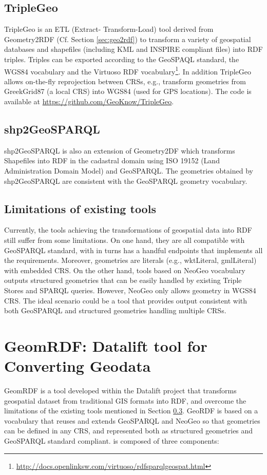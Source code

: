\subsection{TripleGeo}
TripleGeo \cite{triplegeo2014} is an ETL (Extract- Transform-Load) tool derived from Geometry2RDF (Cf. Section \ref{sec:geo2rdf}) to transform a variety of geospatial databases and shapefiles (including KML and INSPIRE compliant files) into RDF triples. Triples can be exported according to the GeoSPAQL standard, the WGS84 vocabulary and the Virtuoso RDF vocabulary\footnote{\url{http://docs.openlinksw.com/virtuoso/rdfsparqlgeospat.html}}. In addition TripleGeo allows on-the-fly reprojection between CRSs, e.g., transform geometries from GreekGrid87 (a local CRS) into WGS84 (used for GPS locations). The code is available at \url{https://github.com/GeoKnow/TripleGeo}.

\subsection{shp2GeoSPARQL}
shp2GeoSPARQL \cite{saavedra14} is also an extension of Geometry2DF which transforms Shapefiles into RDF in the cadastral domain using ISO 19152 \cite{iso2012} (Land Administration Domain Model) and GeoSPARQL. The geometries obtained by shp2GeoSPARQL are consistent with the GeoSPARQL geometry vocabulary.

\subsection{Limitations of existing tools}
\label{sec:limitations}

Currently, the tools achieving the transformations of geospatial data into RDF still suffer from some limitations. On one hand, they are all compatible with GeoSPARQL standard, with in turns has a handful endpoints that implements all the requirements. Moreover, geometries are literals (e.g., wktLiteral, gmlLiteral) with embedded CRS. On the other hand, tools based on NeoGeo vocabulary outputs structured geometries that can be easily handled by existing Triple Stores and SPARQL queries. However, NeoGeo only allows geometry in WGS84 CRS. The ideal scenario could be a tool that provides output consistent with both GeoSPARQL and structured geometries handling multiple CRSs. 


\section{GeomRDF: Datalift tool for Converting Geodata}
\label{sec:geomRDF}
GeomRDF \cite{hamdi14} is a tool developed within the Datalift project that transforms geospatial dataset from traditional GIS formats into RDF, and overcome the limitations of the existing tools mentioned in Section \ref{sec:limitations}. GeoRDF is based on a vocabulary that reuses and extends GeoSPARQL and NeoGeo so that geometries can be defined in any CRS, and represented both as structured geometries and GeoSPARQL standard compliant. \geom is composed of three components: 

